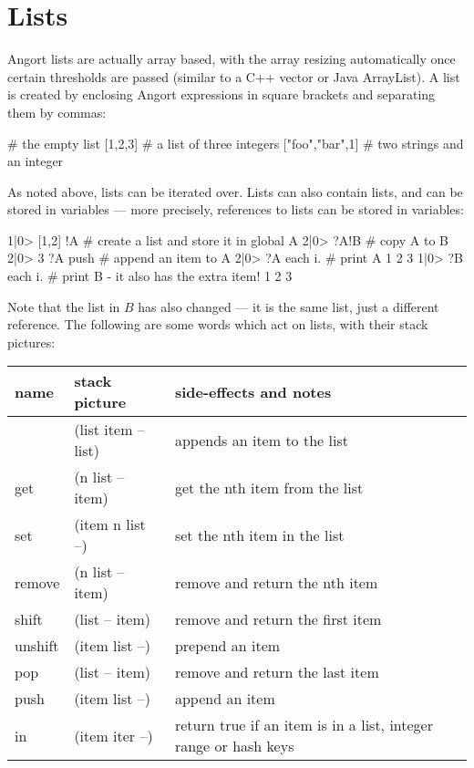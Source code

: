 \section{Lists}
\label{lists}
\indw{[|textbf}\indw{]|textbf}
Angort lists are actually array based, with the array resizing automatically
once certain thresholds are passed (similar to a C++ vector or Java ArrayList).
A list is created by enclosing Angort expressions in square
brackets and separating them by commas:
\begin{v}
[]              # the empty list
[1,2,3]         # a list of three integers
["foo","bar",1] # two strings and an integer
\end{v}
As noted above, lists can be iterated over. Lists can also contain lists,
and can be stored in variables ---  more precisely, references to lists can
be stored in variables:
\begin{v}
1|0> [1,2] !A       # create a list and store it in global A
2|0> ?A!B           # copy A to B
2|0> 3 ?A push      # append an item to A
2|0> ?A each {i.}   # print A
1
2
3
1|0> ?B each {i.}   # print B - it also has the extra item!
1
2
3
\end{v}
Note that the list in $B$ has also changed --- it is the same list,
just a different reference.
The following are some words which act on lists, with their stack pictures:
\indw{[|textbf}\indw{]|textbf}
\begin{center}
\begin{tabular}{|l|l|p{4in}|}\hline
\textbf{name} & \textbf{stack picture} & \textbf{side-effects and notes}\\ \hline
[    & (-- list)    & creates a new list\\
,    & (list item -- list) & appends an item to the list\\
]    & (list item -- list) & appends an item to the list\\
get & (n list -- item) & get the nth item from the list\\
set & (item n list --) & set the nth item in the list\\
remove & (n list -- item) & remove and return the nth item\\
shift & (list -- item) & remove and return the first item\\
unshift & (item list --) & prepend an item\\
pop & (list -- item) & remove and return the last item\\
push & (item list --) & append an item\\
in & (item iter --) & return true if an item is in a list, integer range or hash keys\\
\hline
\end{tabular}
\end{center}
